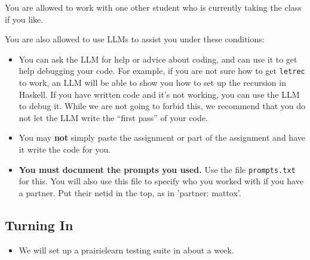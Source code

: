 \documentclass[11pt]{article}
\begin{document}
You are allowed to work with one other student who is currently taking the class if you like.

You are also allowed to use LLMs to assist you under these conditions:

\begin{itemize}
\item You can ask the LLM for help or advice about coding, and can use it to get help debugging your code.  For example, if
you are not sure how to get \texttt{letrec} to work, an LLM will be able to show you how to set up the recursion in Haskell.  
If you have written code and it's not working, you can use the LLM to debug it.  While we are not going to forbid this,
we recommend that you do not let the LLM write the ``first pass'' of your code.
\item You may \textbf{not} simply paste the assignment or part of the assignment and have it write the code for you.
\item \textbf{You must document the prompts you used.}  Use the file \texttt{prompts.txt} for this.  You will also use this file to specify who you worked
with if you have a partner.  Put their netid in the top, as in 'partner: mattox'.
\end{itemize}
\subsection{Turning In}
\label{sec:orga22c3f8}

\begin{itemize}
\item We will set up a prairielearn testing suite in about a week.
\end{itemize}
\end{document}
